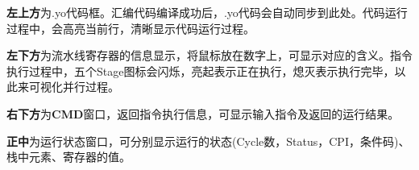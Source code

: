 \documentclass[12pt]{article} %
\begin{document}
\begin{sloppypar}
{\bf 左上方}为.yo代码框。汇编代码编译成功后，.yo代码会自动同步到此处。代码运行过程中，会高亮当前行，清晰显示代码运行过程。

%

{\bf 左下方}为流水线寄存器的信息显示，将鼠标放在数字上，可显示对应的含义。指令执行过程中，五个Stage图标会闪烁，亮起表示正在执行，熄灭表示执行完毕，以此来可视化并行过程。



{\bf 右下方}为{\bf CMD}窗口，返回指令执行信息，可显示输入指令及返回的运行结果。


{\bf 正中}为运行状态窗口，可分别显示运行的状态(Cycle数，Status，CPI，条件码)、栈中元素、寄存器的值。



\end{sloppypar}
\end{document}
